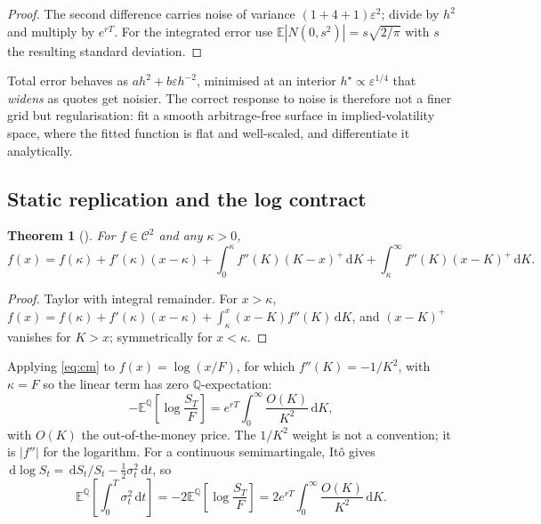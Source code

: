 \documentclass[11pt,a4paper]{article}
\newtheorem{theorem}{Theorem}[section]
\theoremstyle{remark}
\newcommand{\Q}{\mathbb{Q}}
\newcommand{\E}{\mathbb{E}}
\newcommand{\dd}{\,\mathrm{d}}
\begin{document}
\begin{proof}
The second difference carries noise of variance $(1+4+1)\varepsilon^2$;
divide by $h^2$ and multiply by $e^{rT}$. For the integrated error use
$\E|N(0,s^2)| = s\sqrt{2/\pi}$ with $s$ the resulting standard deviation.
\end{proof}

Total error behaves as $ah^2 + b\varepsilon h^{-2}$, minimised at an interior
$h^\star \propto \varepsilon^{1/4}$ that \emph{widens} as quotes get noisier.
The correct response to noise is therefore not a finer grid but regularisation:
fit a smooth arbitrage-free surface in implied-volatility space, where the
fitted function is flat and well-scaled, and differentiate it analytically.

\subsection{Static replication and the log contract}

\begin{theorem}[\citealp{carr2001}]
\label{thm:cm}
For $f\in\mathcal{C}^2$ and any $\kappa>0$,
\begin{equation}
\label{eq:cm}
f(x) = f(\kappa) + f'(\kappa)(x-\kappa)
+ \int_0^\kappa f''(K)(K-x)^+\dd K
+ \int_\kappa^\infty f''(K)(x-K)^+\dd K .
\end{equation}
\end{theorem}

\begin{proof}
Taylor with integral remainder. For $x>\kappa$,
$f(x) = f(\kappa)+f'(\kappa)(x-\kappa)+\int_\kappa^x (x-K)f''(K)\dd K$, and
$(x-K)^+$ vanishes for $K>x$; symmetrically for $x<\kappa$.
\end{proof}

Applying \eqref{eq:cm} to $f(x)=\log(x/F)$, for which $f''(K) = -1/K^2$, with
$\kappa = F$ so the linear term has zero $\Q$-expectation:
\begin{equation}
\label{eq:logcontract}
-\E^\Q\!\left[\log\frac{S_T}{F}\right] = e^{rT}\int_0^\infty \frac{O(K)}{K^2}\dd K,
\end{equation}
with $O(K)$ the out-of-the-money price. The $1/K^2$ weight is not a convention;
it is $|f''|$ for the logarithm. For a continuous semimartingale, It\^o gives
$\dd\log S_t = \dd S_t/S_t - \tfrac12\sigma_t^2\dd t$, so
\begin{equation}
\label{eq:varswap}
\E^\Q\!\left[\int_0^T\sigma_t^2\dd t\right]
= -2\E^\Q\!\left[\log\frac{S_T}{F}\right]
= 2e^{rT}\int_0^\infty\frac{O(K)}{K^2}\dd K .
\end{equation}
\end{document}
